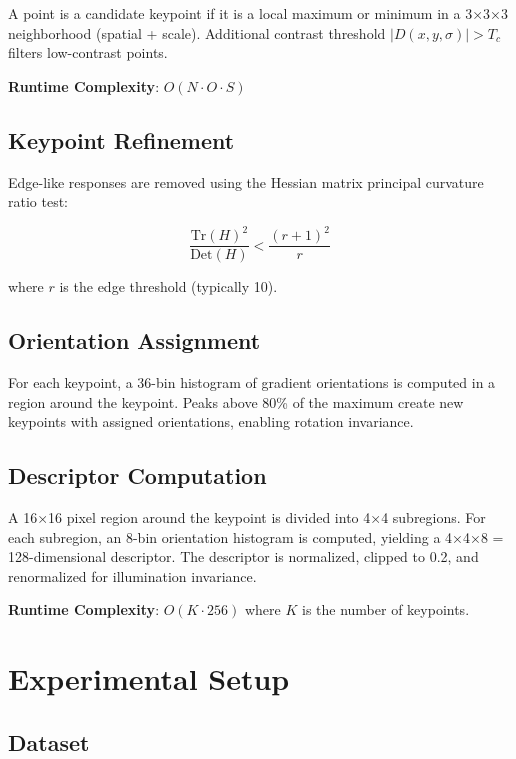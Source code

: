 \documentclass[11pt, a4paper]{article}
\begin{document}
A point is a candidate keypoint if it is a local maximum or minimum in a 3×3×3 neighborhood (spatial + scale). Additional contrast threshold $|D(x,y,\sigma)| > T_c$ filters low-contrast points.

\textbf{Runtime Complexity}: $O(N \cdot O \cdot S)$

\subsection{Keypoint Refinement}

Edge-like responses are removed using the Hessian matrix principal curvature ratio test:

\begin{equation}
\frac{\text{Tr}(H)^2}{\text{Det}(H)} < \frac{(r+1)^2}{r}
\end{equation}

where $r$ is the edge threshold (typically 10).

\subsection{Orientation Assignment}

For each keypoint, a 36-bin histogram of gradient orientations is computed in a region around the keypoint. Peaks above 80\% of the maximum create new keypoints with assigned orientations, enabling rotation invariance.

\subsection{Descriptor Computation}

A 16×16 pixel region around the keypoint is divided into 4×4 subregions. For each subregion, an 8-bin orientation histogram is computed, yielding a 4×4×8 = 128-dimensional descriptor. The descriptor is normalized, clipped to 0.2, and renormalized for illumination invariance.

\textbf{Runtime Complexity}: $O(K \cdot 256)$ where $K$ is the number of keypoints.

\section{Experimental Setup}

\subsection{Dataset}
\end{document}
